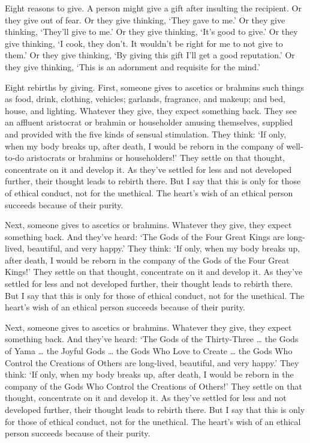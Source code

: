 \documentclass[12pt,openany]{book}%
\begin{document}
Eight reasons to give. A person might give a gift after insulting the recipient. Or they give out of fear. Or they give thinking, ‘They gave to me.’ Or they give thinking, ‘They’ll give to me.’ Or they give thinking, ‘It’s good to give.’ Or they give thinking, ‘I cook, they don’t. It wouldn’t be right for me to not give to them.’ Or they give thinking, ‘By giving this gift I’ll get a good reputation.’ Or they give thinking, ‘This is an adornment and requisite for the mind.’ 

Eight rebirths by giving. First, someone gives to ascetics or brahmins such things as food, drink, clothing, vehicles; garlands, fragrance, and makeup; and bed, house, and lighting. Whatever they give, they expect something back. They see an affluent aristocrat or brahmin or householder amusing themselves, supplied and provided with the five kinds of sensual stimulation. They think: ‘If only, when my body breaks up, after death, I would be reborn in the company of well-to-do aristocrats or brahmins or householders!’ They settle on that thought, concentrate on it and develop it. As they’ve settled for less and not developed further, their thought leads to rebirth there. But I say that this is only for those of ethical conduct, not for the unethical. The heart’s wish of an ethical person succeeds because of their purity. 

Next, someone gives to ascetics or brahmins. Whatever they give, they expect something back. And they’ve heard: ‘The Gods of the Four Great Kings are long-lived, beautiful, and very happy.’ They think: ‘If only, when my body breaks up, after death, I would be reborn in the company of the Gods of the Four Great Kings!’ They settle on that thought, concentrate on it and develop it. As they’ve settled for less and not developed further, their thought leads to rebirth there. But I say that this is only for those of ethical conduct, not for the unethical. The heart’s wish of an ethical person succeeds because of their purity. 

Next, someone gives to ascetics or brahmins. Whatever they give, they expect something back. And they’ve heard: ‘The Gods of the Thirty-Three … the Gods of Yama … the Joyful Gods … the Gods Who Love to Create … the Gods Who Control the Creations of Others are long-lived, beautiful, and very happy.’ They think: ‘If only, when my body breaks up, after death, I would be reborn in the company of the Gods Who Control the Creations of Others!’ They settle on that thought, concentrate on it and develop it. As they’ve settled for less and not developed further, their thought leads to rebirth there. But I say that this is only for those of ethical conduct, not for the unethical. The heart’s wish of an ethical person succeeds because of their purity. 
\end{document}
